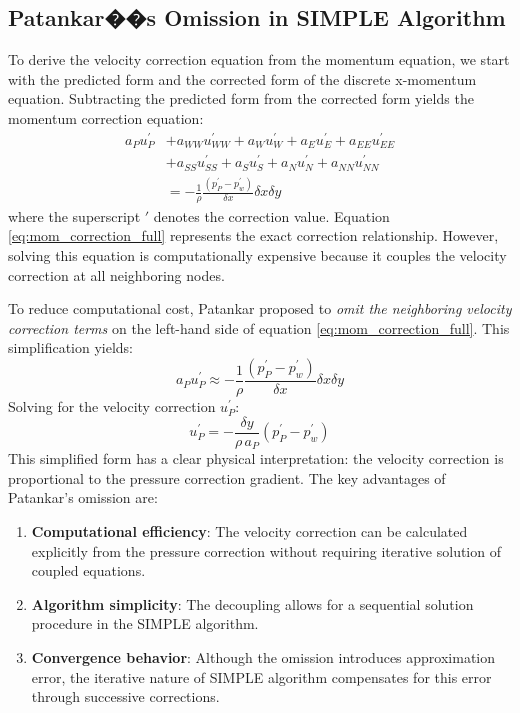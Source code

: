\documentclass[12pt]{article}
\theoremstyle{plain}  %
\theoremstyle{definition}  %
\begin{document}
\subsection{Patankar��s Omission in SIMPLE Algorithm}
\noindent To derive the velocity correction equation from the momentum equation, we start with the predicted form and the corrected form of the discrete x-momentum equation. Subtracting the predicted form from the corrected form yields the momentum correction equation:
\begin{equation}\label{eq:mom_correction_full}
\begin{aligned}
a_{P}u_{P}^{\prime} &+ a_{WW}u_{WW}^{\prime} + a_{W}u_{W}^{\prime} + a_{E}u_{E}^{\prime} + a_{EE}u_{EE}^{\prime}\\
&+ a_{SS}u_{SS}^{\prime} + a_{S}u_{S}^{\prime} + a_{N}u_{N}^{\prime} + a_{NN}u_{NN}^{\prime}\\
&= -\frac{1}{\rho}\frac{(p_{P}^{\prime} - p_{w}^{\prime})}{\delta x} \delta x \delta y
\end{aligned}
\end{equation}
\noindent where the superscript $\prime$ denotes the correction value. Equation \eqref{eq:mom_correction_full} represents the exact correction relationship. However, solving this equation is computationally expensive because it couples the velocity correction at all neighboring nodes.

To reduce computational cost, Patankar proposed to \textit{omit the neighboring velocity correction terms} on the left-hand side of equation \eqref{eq:mom_correction_full}. This simplification yields:
\begin{equation}\label{eq:patankar_omission}
a_{P}u_{P}^{\prime} \approx -\frac{1}{\rho}\frac{(p_{P}^{\prime} - p_{w}^{\prime})}{\delta x} \delta x \delta y
\end{equation}
\noindent Solving for the velocity correction $u_{P}^{\prime}$:
\begin{equation}\label{eq:u_correction_simplified}
\boxed{u_{P}^{\prime} = -\frac{\delta y}{\rho \, a_{P}}(p_{P}^{\prime} - p_{w}^{\prime})}
\end{equation}
\noindent This simplified form has a clear physical interpretation: the velocity correction is proportional to the pressure correction gradient. The key advantages of Patankar's omission are:
\begin{enumerate}
\item \textbf{Computational efficiency}: The velocity correction can be calculated explicitly from the pressure correction without requiring iterative solution of coupled equations.
\item \textbf{Algorithm simplicity}: The decoupling allows for a sequential solution procedure in the SIMPLE algorithm.
\item \textbf{Convergence behavior}: Although the omission introduces approximation error, the iterative nature of SIMPLE algorithm compensates for this error through successive corrections.
\end{enumerate}
\end{document}
